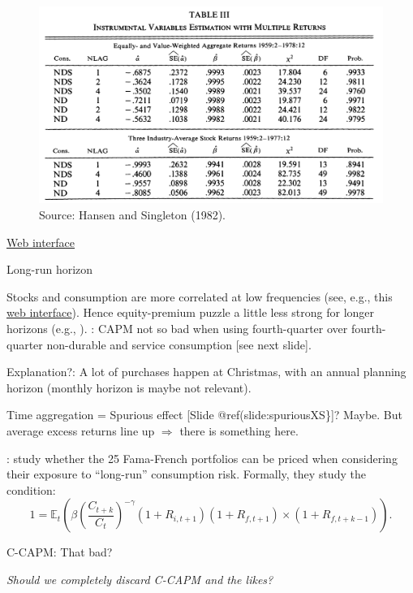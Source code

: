 \documentclass[
  12pt,
]{book}
\theoremstyle{definition}
\theoremstyle{definition}
\theoremstyle{definition}
\theoremstyle{definition}
\theoremstyle{remark}
\begin{document}
\begin{figure}

{\centering \includegraphics[width=1\linewidth]{figures/tableHansenSingleton82A} 

}

\caption{Source: Hansen and Singleton (1982).}\label{fig:HansenSinfgleton1982}
\end{figure}

\href{https://jrenne.shinyapps.io/APModels}{Web interface}

Long-run horizon

Stocks and consumption are more correlated at low frequencies (see, e.g., this \href{https://jrenne.shinyapps.io/APModels}{web interface}). Hence equity-premium puzzle a little less strong for longer horizons (e.g., \citet{DANIEL_MARSHALL_1997}).
\citet{Jagannathan_Wang_2007}: CAPM not so bad when using fourth-quarter over fourth-quarter non-durable and service consumption {[}see next slide{]}.

Explanation?: A lot of purchases happen at Christmas, with an annual planning horizon (monthly horizon is maybe not relevant).

Time aggregation = Spurious effect {[}Slide @ref(slide:spuriousXS\}{]}? Maybe. But average excess returns line up \(\Rightarrow\) there is something here.

\citet{Parker_Julliard_2005}: study whether the 25 Fama-French portfolios can be priced when considering their exposure to ``long-run'' consumption risk. Formally, they study the condition:
\[
1 = \mathbb{E}_t \left( \beta \left(\frac{C_{t+k}}{C_t}\right)^{- \gamma} (1 + R_{i,t+1})(1 + R_{f,t+1})\times (1 + R_{f,t+k-1}) \right).
\]

C-CAPM: That bad?

\emph{Should we completely discard C-CAPM and the likes?}
\end{document}
